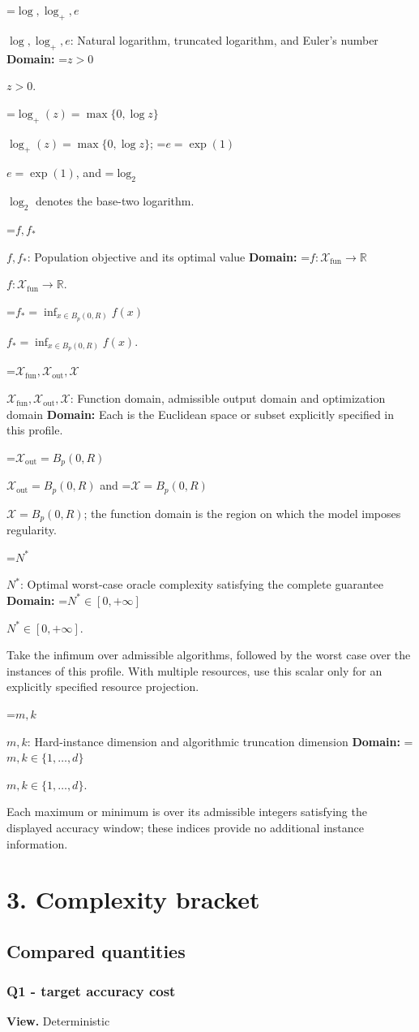 \documentclass[10pt,a4paper]{article}
\newcommand{\AtlasMath}[1]{\par\begingroup\centering\setbox0=\hbox{$\displaystyle #1$}\ifdim\wd0>1.4\linewidth\typeout{ATLAS WIDE FORMULA: \the\wd0}\fi\ifdim\wd0>\linewidth\resizebox{\linewidth}{!}{\box0}\else\box0\fi\par\endgroup}
\newcommand{\AtlasInlineMath}[1]{\begingroup\setbox0=\hbox{$#1$}\ifdim\wd0>.4\linewidth\endgroup\AtlasMath{#1}\else\endgroup$#1$\fi}
\begin{document}
\AtlasInlineMath{\log,\log_+,e}: Natural logarithm, truncated logarithm, and Euler's number \textbf{Domain:} \AtlasInlineMath{z>0}.

\AtlasInlineMath{\log_+(z)=\max\{0,\log z\}}; \AtlasInlineMath{e=\exp(1)}, and \AtlasInlineMath{\log_2} denotes the base-two logarithm.

\AtlasInlineMath{f,f_*}: Population objective and its optimal value \textbf{Domain:} \AtlasInlineMath{f:\mathcal{X}_{\mathrm{fun}}\to\mathbb{R}}.

\AtlasInlineMath{f_*=\inf_{x\in B_p(0,R)}f(x)}.

\AtlasInlineMath{\mathcal{X}_{\mathrm{fun}},\mathcal{X}_{\mathrm{out}},\mathcal{X}}: Function domain, admissible output domain and optimization domain \textbf{Domain:} Each is the Euclidean space or subset explicitly specified in this profile.

\AtlasInlineMath{\mathcal{X}_{\mathrm{out}}=B_p(0,R)} and \AtlasInlineMath{\mathcal{X}=B_p(0,R)}; the function domain is the region on which the model imposes regularity.

\AtlasInlineMath{N^*}: Optimal worst-case oracle complexity satisfying the complete guarantee \textbf{Domain:} \AtlasInlineMath{N^*\in[0,+\infty]}.

Take the infimum over admissible algorithms, followed by the worst case over the instances of this profile. With multiple resources, use this scalar only for an explicitly specified resource projection.

\AtlasInlineMath{m,k}: Hard-instance dimension and algorithmic truncation dimension \textbf{Domain:} \AtlasInlineMath{m,k\in\{1,\ldots,d\}}.

Each maximum or minimum is over its admissible integers satisfying the displayed accuracy window; these indices provide no additional instance information.

\section{3. Complexity bracket}
\subsection{Compared quantities}
\subsubsection{Q1 - target accuracy cost}
\textbf{View.} Deterministic
\end{document}
